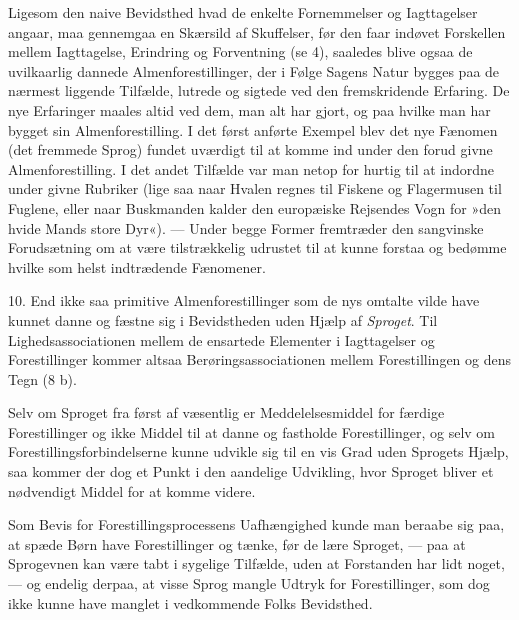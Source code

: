 \documentclass[12pt,a4paper,openany]{book}
\newcommand{\opage}[1]{\marginnote{\footnotesize\textit{[#1]}}}
\begin{document}
Ligesom den naive Bevidsthed hvad de enkelte Fornemmelser og
Iagttagelser angaar, maa gennemgaa en Skærsild af Skuffelser, før den
faar indøvet Forskellen mellem Iagttagelse, Erindring og Forventning (se
4), saaledes blive ogsaa de uvilkaarlig dannede Almenforestillinger, der
i Følge Sagens Natur bygges paa de nærmest liggende Tilfælde, lutrede og
sigtede ved den fremskridende Erfaring. De nye Erfaringer maales altid
ved dem, man alt har gjort, og paa hvilke man har bygget sin
Almenforestilling. I det først anførte Exempel blev det nye Fænomen (det
fremmede Sprog) fundet uværdigt til at komme ind under den forud givne
Almenforestilling. I det andet Tilfælde var man netop for hurtig til at
indordne under givne Rubriker (lige saa naar Hvalen regnes til Fiskene
og Flagermusen til Fuglene, eller naar Buskmanden kalder den europæiske
Rejsendes Vogn for »den hvide Mands store Dyr«). --- Under begge Former
fremtræder den sangvinske Forudsætning om at være tilstrækkelig udrustet
til at kunne forstaa og bedømme hvilke som helst indtrædende Fænomener.

10. End ikke saa primitive Almenforestillinger som de nys omtalte vilde
have kunnet danne og fæstne sig i Bevidstheden uden Hjælp af
\emph{Sproget}. Til Lighedsassociationen mellem de ensartede Elementer i
Iagttagelser og Forestillinger kommer altsaa Berøringsassociationen
mellem Forestillingen og dens Tegn (8 b).

Selv om Sproget fra først af væsentlig er Meddelelsesmiddel for færdige
Forestillinger og ikke Middel til at danne
\opage{206}og fastholde Forestillinger, og selv om
Forestillingsforbindelserne kunne udvikle sig til en vis Grad uden
Sprogets Hjælp, saa kommer der dog et Punkt i den aandelige Udvikling,
hvor Sproget bliver et nødvendigt Middel for at komme videre.

Som Bevis for Forestillingsprocessens Uafhængighed kunde man beraabe sig
paa, at spæde Børn have Forestillinger og tænke, før de lære Sproget,
--- paa at Sprogevnen kan være tabt i sygelige Tilfælde, uden at
Forstanden har lidt noget, --- og endelig derpaa, at visse Sprog mangle
Udtryk for Forestillinger, som dog ikke kunne have manglet i vedkommende
Folks Bevidsthed.
\end{document}
